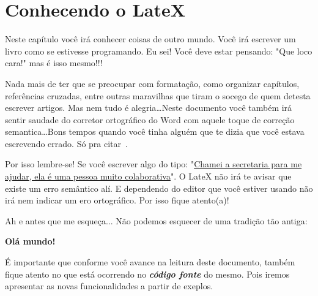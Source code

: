 \chapter{Conhecendo o LateX} \label{capConhecendoLatex}
Neste capítulo você irá conhecer coisas de outro mundo. Você irá escrever um livro como se estivesse programando. Eu sei! Você deve estar pensando: "Que loco cara!" mas é isso mesmo!!!

Nada mais de ter que se preocupar com formatação, como organizar capítulos, referências cruzadas, entre outras maravilhas que tiram o socego de quem detesta escrever artigos. Mas nem tudo é alegria\ldots Neste documento você também irá sentir saudade do corretor ortográfico do Word com aquele toque de correção semantica\ldots Bons tempos quando você tinha alguém que te dizia que você estava escrevendo errado. Só pra citar~\cite{camargo}.

Por isso lembre-se! Se você escrever algo do tipo: "\underline{Chamei a secretaria para me ajudar, ela é uma pessoa muito colaborativa}". O LateX não irá te avisar que existe um erro semântico alí. E dependendo do editor que você estiver usando não irá nem indicar um ero ortográfico. Por isso fique atento(a)!

Ah e antes que me esqueça... Não podemos esquecer de uma tradição tão antiga:

\textbf{Olá mundo!}

É importante que conforme você avance na leitura deste documento, também fique atento no que está ocorrendo no \textbf{\textit{código fonte}} do mesmo. Pois iremos apresentar as novas funcionalidades a partir de exeplos.

